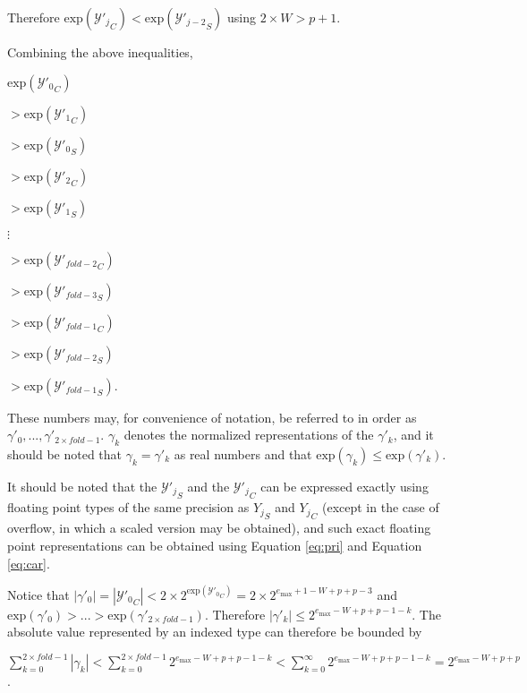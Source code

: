 \documentclass[12pt]{article}
\providecommand{\exp}{\ensuremath{\text{exp}}}
\providecommand{\max}{\ensuremath{\text{max}}}
\theoremstyle{plain}
\begin{document}
    Therefore $\exp({\mathcal{Y}'_j}_C) < \exp({\mathcal{Y}'_{j - 2}}_S)$ using $2 \times W > p + 1$.

    Combining the above inequalities,

    \indent\indent $\exp({\mathcal{Y}'_0}_C)$

    \indent\indent $ > \exp({\mathcal{Y}'_1}_C)$

    \indent\indent $ > \exp({\mathcal{Y}'_0}_S)$

    \indent\indent $ > \exp({\mathcal{Y}'_2}_C)$

    \indent\indent $ > \exp({\mathcal{Y}'_1}_S)$

    \indent\indent $ \vdots$

    \indent\indent $ > \exp({\mathcal{Y}'_{fold - 2}}_C)$

    \indent\indent $ > \exp({\mathcal{Y}'_{fold - 3}}_S)$

    \indent\indent $ > \exp({\mathcal{Y}'_{fold - 1}}_C)$

    \indent\indent $ > \exp({\mathcal{Y}'_{fold - 2}}_S)$

    \indent\indent $ > \exp({\mathcal{Y}'_{fold - 1}}_S)$.

    These numbers may, for convenience of notation, be referred to in order as $\gamma'_0, ..., \gamma'_{2 \times fold - 1}$.
    $\gamma_k$ denotes the normalized representations of the $\gamma'_k$, and it should be noted that $\gamma_k = \gamma'_k$ as real numbers and that $\exp(\gamma_k) \leq \exp(\gamma'_k)$.

    It should be noted that the ${\mathcal{Y}'_j}_S$ and the ${\mathcal{Y}'_j}_C$ can be expressed exactly using floating point types of the same precision as ${Y_j}_S$ and ${Y_j}_C$ (except in the case of overflow, in which a scaled version may be obtained), and such exact floating point representations can be obtained using Equation \ref{eq:pri} and Equation \ref{eq:car}.

    Notice that $|\gamma'_0| = |{\mathcal{Y}'_0}_C| < 2 \times 2^{\exp({\mathcal{Y}'_0}_C)} = 2 \times 2^{e_{\max} + 1 - W + p + p - 3}$ and $\exp(\gamma'_0) > ... > \exp(\gamma'_{2 \times fold - 1})$.  Therefore $|\gamma'_k| \leq 2^{e_{\max} - W + p + p - 1 - k}$. The absolute value represented by an indexed type can therefore be bounded by

    $\sum\limits_{k = 0}^{2 \times fold - 1} |\gamma_k| < \sum\limits_{k = 0}^{2 \times fold - 1} 2^{e_{\max} - W + p + p - 1 - k} < \sum\limits_{k = 0}^{\infty} 2^{e_{\max} - W + p + p - 1 - k} = 2^{e_{\max} - W + p + p}$.
\end{document}
